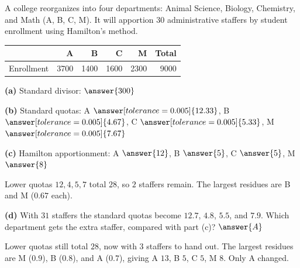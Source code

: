 \documentclass[12pt]{ximera}
\begin{document}
\begin{problem}
A college reorganizes into four departments: Animal Science, Biology, Chemistry, and Math
(A, B, C, M). It will apportion $30$ administrative staffers by student enrollment using
Hamilton's method.
\begin{center}
\begin{tabular}{r|rrrrr}
 & A & B & C & M & Total\\\hline
Enrollment & 3700 & 1400 & 1600 & 2300 & 9000
\end{tabular}
\end{center}

\begin{prompt}
\textbf{(a)} Standard divisor: $\answer{300}$
\end{prompt}

\begin{prompt}
\textbf{(b)} Standard quotas: A $\answer[tolerance=0.005]{12.33}$, B
$\answer[tolerance=0.005]{4.67}$, C $\answer[tolerance=0.005]{5.33}$, M
$\answer[tolerance=0.005]{7.67}$
\end{prompt}

\begin{prompt}
\textbf{(c)} Hamilton apportionment: A $\answer{12}$, B $\answer{5}$, C $\answer{5}$,
M $\answer{8}$
\begin{feedback}
Lower quotas $12,4,5,7$ total $28$, so $2$ staffers remain. The largest residues are
B and M ($0.67$ each).
\end{feedback}
\end{prompt}

\begin{prompt}
\textbf{(d)} With $31$ staffers the standard quotas become $12.7$, $4.8$, $5.5$, and $7.9$.
Which department gets the extra staffer, compared with part (c)? $\answer{A}$
\begin{feedback}
Lower quotas still total $28$, now with $3$ staffers to hand out. The largest residues
are M ($0.9$), B ($0.8$), and A ($0.7$), giving A $13$, B $5$, C $5$, M $8$. Only A
changed.
\end{feedback}
\end{prompt}
\end{problem}
\end{document}
